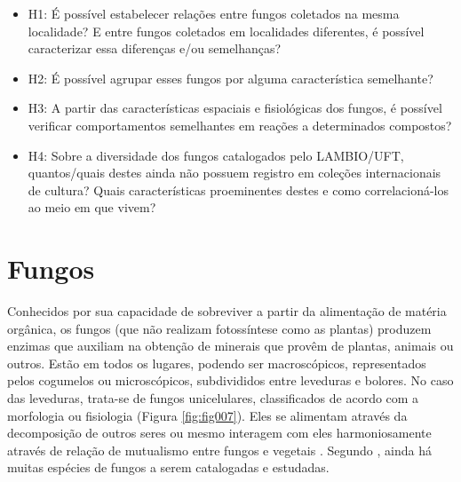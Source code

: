 \documentclass[tcc2]{classe_uftex/uftex}
\begin{document}
    \begin{itemize}
        \item H1: É possível estabelecer relações entre fungos coletados na mesma localidade? E entre fungos coletados em localidades diferentes, é possível caracterizar essa diferenças e/ou semelhanças?
        \item H2: É possível agrupar esses fungos por alguma característica semelhante?
        \item H3: A partir das características espaciais e fisiológicas dos fungos, é possível verificar comportamentos semelhantes em reações a determinados compostos? %
        \item H4: Sobre a diversidade dos fungos catalogados pelo LAMBIO/UFT, quantos/quais destes ainda não possuem registro em coleções internacionais de cultura? Quais características proeminentes destes e como correlacioná-los ao meio em que vivem? %
    \end{itemize}


\chapter{Fungos}
\label{cap:fungos}
Conhecidos por sua capacidade de sobreviver a partir da alimentação de matéria orgânica, os fungos (que não realizam fotossíntese como as plantas) produzem enzimas que auxiliam na obtenção de minerais que provêm de plantas, animais ou outros. Estão em todos os lugares, podendo ser macroscópicos, representados pelos cogumelos ou microscópicos, subdivididos entre leveduras e bolores. No caso das leveduras, trata-se de fungos unicelulares, classificados de acordo com a morfologia ou fisiologia (Figura \ref{fig:fig007}). Eles se alimentam através da decomposição de outros seres ou mesmo interagem com eles harmoniosamente através de relação de mutualismo entre fungos e vegetais \cite{2008:Peay}. Segundo , ainda há muitas espécies de fungos a serem catalogadas e estudadas.
\end{document}
